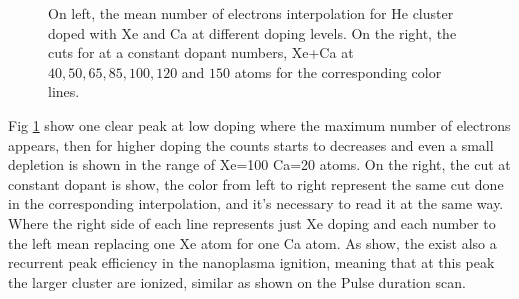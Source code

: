 \begin{figure}[h!]
\begin{subfigure}[l]{0.48\textwidth}
\end{subfigure} 

\hfill
\caption[Xe-Ca interpolation num electrons]{ On left, the mean number of electrons interpolation for He cluster doped with Xe and Ca at different doping levels. On the right, the cuts for at a constant dopant numbers, Xe+Ca at $40,50,65,85,100,120$ and $150$ atoms for the corresponding color lines.   }
\label{fig:XEcaelect}
\end{figure}

Fig \ref{fig:XEcaelect} show one clear peak at low doping where the maximum  number of electrons appears, then for higher doping the counts starts to decreases and even a small depletion is shown in the range of Xe=100 Ca=20 atoms. On the right, the cut at constant dopant is show, the color from left to right represent the same cut done in the corresponding interpolation, and it’s necessary to read it at the same way. Where the right side of each line represents just Xe doping and each number to the left mean replacing one Xe atom for one Ca atom. As show, the exist also a recurrent peak efficiency in the nanoplasma ignition, meaning that at this peak the larger cluster are ionized, similar as shown on the Pulse duration scan.



